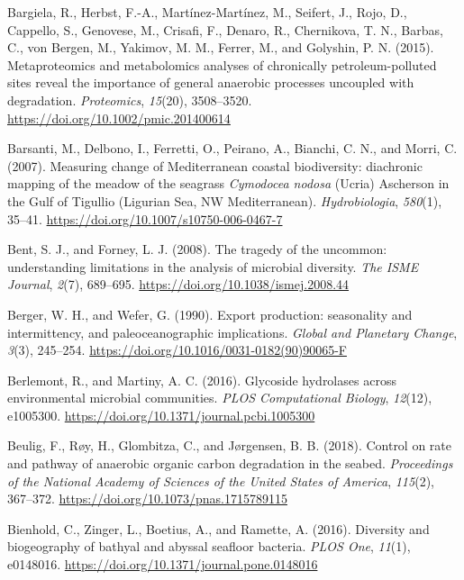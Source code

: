 \documentclass[
  12 pt,
]{book}
\newlength{\cslhangindent}
\newlength{\cslentryspacingunit} %
\newenvironment{CSLReferences}[2] %
 {%
  \setlength{\parindent}{0pt}
  \ifodd #1
  \let\oldpar\par
  \def\par{\hangindent=\cslhangindent\oldpar}
  \fi
  \setlength{\parskip}{#2\cslentryspacingunit}
 }%
 {}
\begin{document}
\begin{CSLReferences}{1}{0}
\leavevmode{}%
Bargiela, R., Herbst, F.-A., Martínez-Martínez, M., Seifert, J., Rojo, D., Cappello, S., Genovese, M., Crisafi, F., Denaro, R., Chernikova, T. N., Barbas, C., von Bergen, M., Yakimov, M. M., Ferrer, M., and Golyshin, P. N. (2015). Metaproteomics and metabolomics analyses of chronically petroleum-polluted sites reveal the importance of general anaerobic processes uncoupled with degradation. \emph{Proteomics}, \emph{15}(20), 3508--3520. \url{https://doi.org/10.1002/pmic.201400614}

\leavevmode{}%
Barsanti, M., Delbono, I., Ferretti, O., Peirano, A., Bianchi, C. N., and Morri, C. (2007). Measuring change of {Mediterranean} coastal biodiversity: diachronic mapping of the meadow of the seagrass {{{\emph{Cymodocea nodosa}}} (Ucria) Ascherson in the Gulf of Tigullio (Ligurian Sea, NW Mediterranean)}. \emph{Hydrobiologia}, \emph{580}(1), 35--41. \url{https://doi.org/10.1007/s10750-006-0467-7}

\leavevmode{}%
Bent, S. J., and Forney, L. J. (2008). The tragedy of the uncommon: understanding limitations in the analysis of microbial diversity. \emph{The ISME Journal}, \emph{2}(7), 689--695. \url{https://doi.org/10.1038/ismej.2008.44}

\leavevmode{}%
Berger, W. H., and Wefer, G. (1990). Export production: seasonality and intermittency, and paleoceanographic implications. \emph{Global and Planetary Change}, \emph{3}(3), 245--254. \url{https://doi.org/10.1016/0031-0182(90)90065-F}

\leavevmode{}%
Berlemont, R., and Martiny, A. C. (2016). Glycoside hydrolases across environmental microbial communities. \emph{PLOS Computational Biology}, \emph{12}(12), e1005300. \url{https://doi.org/10.1371/journal.pcbi.1005300}

\leavevmode{}%
Beulig, F., Røy, H., Glombitza, C., and Jørgensen, B. B. (2018). Control on rate and pathway of anaerobic organic carbon degradation in the seabed. \emph{Proceedings of the National Academy of Sciences of the United States of America}, \emph{115}(2), 367--372. \url{https://doi.org/10.1073/pnas.1715789115}

\leavevmode{}%
Bienhold, C., Zinger, L., Boetius, A., and Ramette, A. (2016). Diversity and biogeography of bathyal and abyssal seafloor bacteria. \emph{PLOS One}, \emph{11}(1), e0148016. \url{https://doi.org/10.1371/journal.pone.0148016}


\end{CSLReferences}
\end{document}

